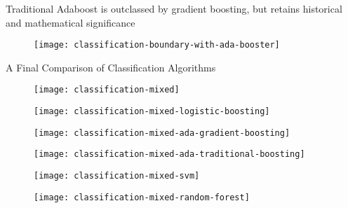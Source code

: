 %
\begin{frame}[fragile]
Traditional Adaboost is outclassed by gradient boosting, but retains historical and mathematical significance

  \begin{figure}
    \texttt{[image: classification-boundary-with-ada-booster]}
  \end{figure}
 
\end{frame}
%
\begin{frame}{A Final Comparison of Classification Algorithms}

  \begin{figure}
    \texttt{[image: classification-mixed]}
  \end{figure}

\end{frame}
%
\begin{frame}

  \begin{figure}
    \texttt{[image: classification-mixed-logistic-boosting]}
  \end{figure}
  
\end{frame}
%
\begin{frame}

  \begin{figure}
    \texttt{[image: classification-mixed-ada-gradient-boosting]}
  \end{figure}
  
\end{frame}
%
\begin{frame}

  \begin{figure}
    \texttt{[image: classification-mixed-ada-traditional-boosting]}
  \end{figure}
  
\end{frame}
%
\begin{frame}

  \begin{figure}
    \texttt{[image: classification-mixed-svm]}
  \end{figure}
  
\end{frame}
%
\begin{frame}

  \begin{figure}
    \texttt{[image: classification-mixed-random-forest]}
  \end{figure}
  
\end{frame}